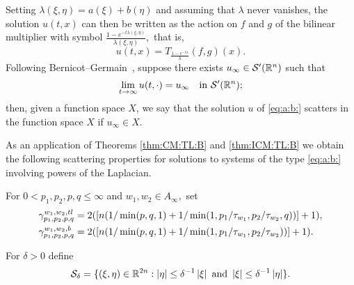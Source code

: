 Setting $\lambda(\xi,\eta)=a(\xi)+b(\eta)$ and assuming that $\lambda$ never vanishes, the solution $u(t,x)$ can then be written as the action on $f$ and $g$ of the bilinear multiplier  with symbol $\frac{1-e^{-t\lambda(\xi,\eta)}}{\lambda(\xi,\eta)},$ that is,  
\begin{equation}\label{u:T:lambda}
u(t,x) = T_{\frac{1-e^{-t\lambda}}{\lambda}}(f,g)(x).
\end{equation}
Following Bernicot--Germain~\cite[Section 9.4]{MR2680189}, suppose there exists   $u_\infty\in {\mathcal{S}'}({{\mathbb R}^n})$ such that 
\begin{equation}\label{def:u:infty}
\lim\limits_{t \to \infty} u(t, \cdot ) = u_\infty \quad \text{in } {\mathcal{S}'}({{\mathbb R}^n});
\end{equation}
then, given a function space $X$, we say that the solution $u$ of  \eqref{eq:a:b:} scatters in the function space $X$ if $u_\infty \in X.$

As an application of Theorems \ref{thm:CM:TL:B} and \ref{thm:ICM:TL:B} we obtain the following scattering properties for solutions to  systems of the type \eqref{eq:a:b:} involving powers of the Laplacian. 

  

For $0<p_1,p_2, p, q\le \infty$ and $w_1,w_2\in A_\infty,$ set
\begin{align*}
\gamma_{p_1,p_2,p,q}^{w_1,w_2, tl}&=2( [n(1/\min(p,q,1)+1/\min(1,p_1/\tau_{w_1},p_2/\tau_{w_2},q))]+1),\\
 \gamma_{p_1,p_2,p,q}^{w_1,w_2,b}&=2( [n(1/\min(p,q,1)+1/\min(1,p_1/\tau_{w_1},p_2/\tau_{w_2}))]+1).
\end{align*}


For $\delta>0$ define
$$
\mathcal{S}_{\delta}=\{(\xi,\eta)\in \mathbb{R}^{2n}: \left\vert \eta \right\vert\le \delta^{-1}\left\vert \xi \right\vert\text{ and }\left\vert \xi \right\vert\le \delta^{-1}\left\vert \eta \right\vert\}.
$$

